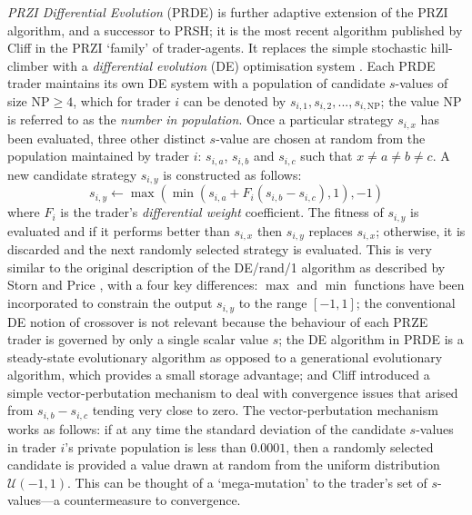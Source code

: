 \documentclass[conference]{IEEEtran}
\begin{document}
\textit{PRZI Differential Evolution} (PRDE) \cite{PRDE} is further adaptive extension of the PRZI algorithm, and a successor to PRSH; it is the most recent algorithm published by Cliff in the PRZI `family' of trader-agents.
It replaces the simple stochastic hill-climber with a \textit{differential evolution} (DE) optimisation system \cite{StornPrice}.
Each PRDE trader maintains its own DE system with a population of candidate $s$-values of size $\mathrm{NP}\ge4$, which for trader $i$ can be denoted by $s_{i,1},s_{i,2},...,s_{i,\mathrm{NP}}$; the value $\mathrm{NP}$ is referred to as the \textit{number in population}.
Once a particular strategy $s_{i,x}$ has been evaluated, three other distinct $s$-value are chosen at random from the population maintained by trader $i$: $s_{i,a}$, $s_{i,b}$ and $s_{i,c}$ such that $x\ne a\ne b\ne c$.
A new candidate strategy $s_{i,y}$ is constructed as follows:
\[
s_{i,y}\leftarrow\max(\min(s_{i,a}+F_i(s_{i,b}-s_{i,c}),1), -1)
\]
where $F_i$ is the trader's \textit{differential weight} coefficient.
The fitness of $s_{i,y}$ is evaluated and if it performs better than $s_{i,x}$ then $s_{i,y}$ replaces $s_{i,x}$; otherwise, it is discarded and the next randomly selected strategy is evaluated.
This is very similar to the original description of the DE/rand/1 algorithm as described by Storn and Price \cite{StornPrice}, with a four key differences: $\max$ and $\min$ functions have been incorporated to constrain the output $s_{i,y}$ to the range $[-1,1]$; the conventional DE notion of crossover is not relevant because the behaviour of each PRZE trader is governed by only a single scalar value $s$; the DE algorithm in PRDE is a steady-state evolutionary algorithm as opposed to a generational evolutionary algorithm, which provides a small storage advantage; and Cliff introduced a simple vector-perbutation mechanism to deal with convergence issues that arised from $s_{i,b}-s_{i,c}$ tending very close to zero.
The vector-perbutation mechanism works as follows: if at any time the standard deviation of the candidate $s$-values in trader $i$'s private population is less than $0.0001$, then a randomly selected candidate is provided a value drawn at random from the uniform distribution $\mathcal{U}(-1,1)$.
This can be thought of a `mega-mutation' to the trader's set of $s$-values---a countermeasure to convergence.
\end{document}
